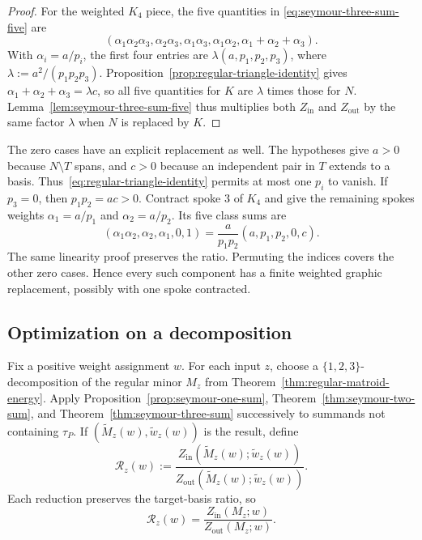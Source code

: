\documentclass[11pt]{article}
\numberwithin{equation}{section}
\theoremstyle{remark}
\begin{document}
\begin{proof}
For the weighted $K_4$ piece, the five quantities in
\eqref{eq:seymour-three-sum-five} are
\begin{equation}
    \left(
        \alpha_1\alpha_2\alpha_3,
        \alpha_2\alpha_3,
        \alpha_1\alpha_3,
        \alpha_1\alpha_2,
        \alpha_1+\alpha_2+\alpha_3
    \right).
    \label{eq:k4-five-sums}
\end{equation}
With $\alpha_i=a/p_i$, the first four entries are
$\lambda(a,p_1,p_2,p_3)$, where
$\lambda:=a^2/(p_1p_2p_3)$. Proposition~\ref{prop:regular-triangle-identity}
gives $\alpha_1+\alpha_2+\alpha_3=\lambda c$, so all five quantities for
$K$ are $\lambda$ times those for $N$. Lemma~\ref{lem:seymour-three-sum-five}
thus multiplies both $Z_{\mathrm{in}}$ and $Z_{\mathrm{out}}$ by the
same factor $\lambda$ when $N$ is replaced by $K$.
\end{proof}

The zero cases have an explicit replacement as well. The hypotheses give
$a>0$ because $N\setminus T$ spans, and $c>0$ because an independent pair
in $T$ extends to a basis. Thus~\eqref{eq:regular-triangle-identity} permits
at most one $p_i$ to vanish. If $p_3=0$, then $p_1p_2=ac>0$.
Contract spoke $3$ of $K_4$ and give the remaining spokes weights
$\alpha_1=a/p_1$ and $\alpha_2=a/p_2$. Its five class sums are
\[
 (\alpha_1\alpha_2,\alpha_2,\alpha_1,0,1)
 =\frac{a}{p_1p_2}(a,p_1,p_2,0,c).
\]
The same linearity proof preserves the ratio. Permuting the indices covers
the other zero cases. Hence every such component has a finite weighted
graphic replacement, possibly with one spoke contracted.

\subsection{Optimization on a decomposition}
\label{subsec:seymour-fixed-weight}

Fix a positive weight assignment $w$. For each input $z$, choose a
$\{1,2,3\}$-decomposition of the regular minor $M_z$ from
Theorem~\ref{thm:regular-matroid-energy}. Apply
Proposition~\ref{prop:seymour-one-sum}, Theorem~\ref{thm:seymour-two-sum},
and Theorem~\ref{thm:seymour-three-sum} successively to summands not
containing $\tau_P$. If $(\widetilde M_z(w),\widetilde w_z(w))$ is the
result, define
\begin{equation}
    \mathscr R_z(w)
    :=
    \frac{Z_{\mathrm{in}}(\widetilde M_z(w);\widetilde w_z(w))}
         {Z_{\mathrm{out}}(\widetilde M_z(w);\widetilde w_z(w))}.
    \label{eq:seymour-reduced-ratio}
\end{equation}
Each reduction preserves the target-basis ratio, so
\begin{equation}
    \mathscr R_z(w)
    =
    \frac{Z_{\mathrm{in}}(M_z;w)}{Z_{\mathrm{out}}(M_z;w)}.
    \label{eq:seymour-ratio-invariant}
\end{equation}
\end{document}
